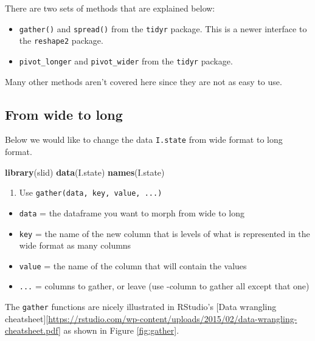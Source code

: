 \documentclass[]{book}
\newenvironment{Shaded}{\begin{snugshade}}{\end{snugshade}}
\newcommand{\KeywordTok}[1]{\textcolor[rgb]{0.13,0.29,0.53}{\textbf{#1}}}
\newcommand{\NormalTok}[1]{#1}
\providecommand{\tightlist}{%
  \setlength{\itemsep}{0pt}\setlength{\parskip}{0pt}}
\begin{document}
There are two sets of methods that are explained below:

\begin{itemize}
\item
  \texttt{gather()} and \texttt{spread()} from the \texttt{tidyr}
  package. This is a newer interface to the \texttt{reshape2} package.
\item
  \texttt{pivot\_longer} and \texttt{pivot\_wider} from the
  \texttt{tidyr} package.
\end{itemize}

Many other methods aren't covered here since they are not as easy to
use.

\subsection{From wide to long}\label{from-wide-to-long}

Below we would like to change the data \texttt{I.state} from wide format
to long format.

\begin{Shaded}
\begin{Highlighting}[]
\KeywordTok{library}\NormalTok{(slid)}
\KeywordTok{data}\NormalTok{(I.state)}
\KeywordTok{names}\NormalTok{(I.state)}
\end{Highlighting}
\end{Shaded}

\begin{enumerate}
\def\labelenumi{\arabic{enumi}.}
\tightlist
\item
  Use \texttt{gather(data,\ key,\ value,\ ...)}
\end{enumerate}

\begin{itemize}
\tightlist
\item
  \texttt{data} = the dataframe you want to morph from wide to long
\item
  \texttt{key} = the name of the new column that is levels of what is
  represented in the wide format as many columns
\item
  \texttt{value} = the name of the column that will contain the values
\item
  \texttt{...} = columns to gather, or leave (use -column to gather all
  except that one)
\end{itemize}

The \texttt{gather} functions are nicely illustrated in RStudio's
{[}Data wrangling
cheatsheet{]}{[}\url{https://rstudio.com/wp-content/uploads/2015/02/data-wrangling-cheatsheet.pdf}{]}
as shown in Figure \ref{fig:gather}.
\end{document}
